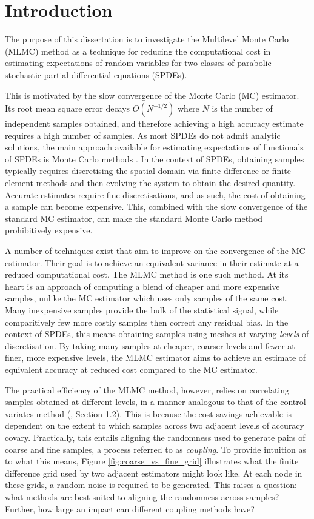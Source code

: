\chapter{Introduction}\label{sec:intro}

The purpose of this dissertation is to investigate the 
Multilevel Monte Carlo (MLMC) method as a technique for reducing 
the computational cost in estimating expectations of random variables 
for two classes of parabolic stochastic partial differential equations (SPDEs).

This is motivated by the slow convergence of the Monte Carlo 
(MC) estimator. Its root mean square error 
decays $O(N^{-1/2})$ where $N$ is the number 
of independent samples obtained, and therefore achieving a high accuracy 
estimate requires a high number of samples. As most SPDEs do not admit 
analytic solutions, the main approach available for estimating expectations of 
functionals of SPDEs is Monte Carlo methods \cite{giles2015multilevel}. In the context
of SPDEs, obtaining samples typically requires discretising 
the spatial domain via finite difference or finite element methods
and then evolving the system to obtain the desired quantity. Accurate 
estimates require fine discretisations, and as such, the cost of obtaining 
a sample can become expensive. This, combined with the slow convergence of the 
standard MC estimator, can make the standard Monte Carlo method prohibitively
expensive.

A number of techniques exist that aim to improve on the convergence of 
the MC estimator. Their goal is to achieve an equivalent variance in their estimate 
at a reduced computational cost. The MLMC method is one such method. 
At its heart is an approach of computing a blend of cheaper and more expensive
samples, unlike the MC estimator which uses only samples of the same cost.
Many inexpensive samples provide the bulk of the statistical signal, 
while comparitively few more costly samples then correct any residual bias.
In the context of SPDEs, this means obtaining samples using meshes at 
varying \textit{levels} of discretisation. By taking many samples at cheaper,
coarser levels and fewer at finer, more expensive levels, the MLMC 
estimator aims to achieve an estimate of equivalent accuracy at reduced cost
compared to the MC estimator.

The practical efficiency of the MLMC method, however, relies on correlating 
samples obtained at different levels, in a manner analogous to that of the 
control variates method (\cite{giles2015multilevel}, Section 1.2). 
This is because the cost savings achievable is dependent on the extent to which 
samples across two adjacent levels of accuracy covary. Practically, this 
entails aligning the randomness used to generate pairs of coarse and 
fine samples, a process referred to as \textit{coupling}.
To provide intuition as to what this means, Figure
\ref{fig:coarse_vs_fine_grid} illustrates what the finite difference 
grid used by two adjacent estimators might look like. At each 
node in these grids, a random noise is required to be generated. 
This raises a question: what methods are best suited to aligning the 
randomness across samples? Further, how large an impact 
can different coupling methods have?

